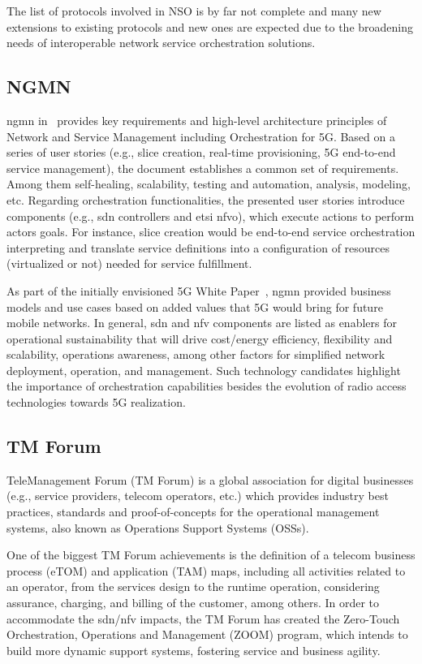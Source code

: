 The list of protocols involved in NSO is by far not complete and many new extensions to existing protocols and new ones are expected due to the broadening needs of interoperable network service orchestration solutions.

\subsection{NGMN}
\gls{ngmn} in~\cite{NGMN:5G:2017} provides key requirements and high-level architecture principles of Network and Service Management including Orchestration for 5G. Based on a series of user stories (e.g., slice creation, real-time provisioning, 5G end-to-end service management), the document establishes a common set of requirements. Among them self-healing, scalability, testing and automation, analysis, modeling, etc. Regarding orchestration functionalities, the presented user stories introduce components (e.g., \gls{sdn} controllers and \gls{etsi} \gls{nfvo}), which execute actions to perform actors goals. For instance, slice creation would be end-to-end service orchestration interpreting and translate service definitions into a configuration of resources (virtualized or not) needed for service fulfillment.  

As part of the initially envisioned 5G White Paper~\cite{NGMNAlliance20155GPaper}, \gls{ngmn} provided business models and use cases based on added values that 5G would bring for future mobile networks. In general, \gls{sdn} and \gls{nfv} components are listed as enablers for operational sustainability that will drive cost/energy efficiency, flexibility and scalability, operations awareness, among other factors for simplified network deployment, operation, and management. Such technology candidates highlight the importance of orchestration capabilities besides the evolution of radio access technologies towards 5G realization. 

\subsection{TM Forum}
TeleManagement Forum (TM Forum) is a global association for
digital businesses (e.g., service providers, telecom operators, etc.) which provides industry best practices, standards and proof-of-concepts for the operational management systems, also known as Operations Support Systems (OSSs). 

One of the biggest TM Forum achievements is the definition of a telecom business process (eTOM) and application (TAM) maps, including all activities related to an operator, from the services design to the runtime operation, considering assurance, charging, and billing of the customer, among others. In order to accommodate the \gls{sdn}/\gls{nfv} impacts, the TM Forum has created the Zero-Touch Orchestration, Operations and Management (ZOOM) program, which intends to build more dynamic support systems, fostering service and business agility.

